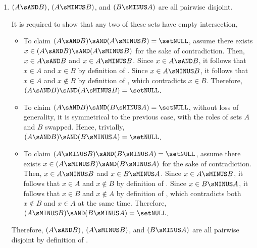 \begin{enumerate}
\begin{enumerate}
\begin{subprove}
      \begin{itemize}
        \item If $x \in A \sAND B$, then $x \in A$ and $x \in B$ by definition, so $x \in A \sOR B$.
        \item If $x \in A \sMINUS B$, then $x \in A$ by definition, so $x \in A \sOR B$ by definition.
        \item If $x \in B \sMINUS A$, then $x \in B$ by definition, so $x \in A \sOR B$ by definition.
      \end{itemize}
      Hence, proof by cases, $(A \sAND B) \sOR(A \sMINUS B) \sOR(B \sMINUS A) \subseteq A \sOR B$.\vspace*{5px}\\
      Therefore, by ($\subseteq$) and ($\supseteq$), 
      $(A \sOR B)=(A \sAND B) \sOR(A \sMINUS B) \sOR(B \sMINUS A)$.
    \end{subprove}

    \item $(A \sAND B)$, $(A \sMINUS B)$, and $(B \sMINUS A)$ are all pairwise disjoint.
    \begin{subprove}
      It is required to show that any two of these sets have empty intersection,
      \begin{itemize}
        \item To claim $(A \sAND B) \sAND (A \sMINUS B) = \setNULL$,
        assume there exists $x \in (A \sAND B) \sAND (A \sMINUS B)$ for 
        the sake of contradiction. Then, $x \in A \sAND B$ and $x \in A \sMINUS B$. 
        Since $x \in A \sAND B$, it follows that $x \in A$ and $x \in B$ by definition of . 
        Since $x \in A \sMINUS B$, it follows that $x \in A$ and $x \notin B$ by definition of , 
        which contradicts $x \in B$. Therefore, $(A \sAND B) \sAND (A \sMINUS B) = \setNULL$.
        \item To claim $(A \sAND B) \sAND (B \sMINUS A) = \setNULL$, without loss of generality, 
        it is symmetrical to the previous case, with the roles of sets $A$ and $B$ swapped.
        Hence, trivially, $(A \sAND B) \sAND (B \sMINUS A) = \setNULL$.
        \item To claim $(A \sMINUS B) \sAND (B \sMINUS A) = \setNULL$,
        assume there exists $x \in (A \sMINUS B) \sAND (B \sMINUS A)$ for 
        the sake of contradiction. Then, $x \in A \sMINUS B$ and $x \in B \sMINUS A$. 
        Since $x \in A \sMINUS B$, it follows that $x \in A$ and $x \notin B$ by definition of . 
        Since $x \in B \sMINUS A$, it follows that $x \in B$ and $x \notin A$ by definition of , 
        which contradicts both $x \notin B$ and $x \in A$ at the same time. 
        Therefore, $(A \sMINUS B) \sAND (B \sMINUS A) = \setNULL$.
      \end{itemize}
      Therefore, $(A \sAND B)$, $(A \sMINUS B)$, and $(B \sMINUS A)$ are all pairwise disjoint by definition of .
    \end{subprove}
  \end{enumerate}
  





\end{enumerate}
